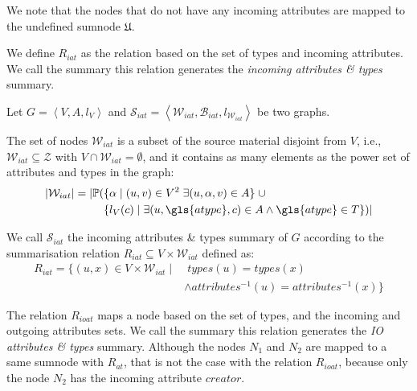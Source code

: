 \begin{remark}
We note that the nodes that do not have any incoming attributes are mapped to the undefined sumnode $\mathfrak{U}$.
\end{remark}

\vspace{.5cm}


We define $R_{iat}$ as the relation based on the set of types and incoming attributes. We call the summary this relation generates the \emph{incoming attributes \& types} summary.

\begin{definition}
	Let $G=\left\langle V, A, l_V \right\rangle$ and $\mathcal{S}_{iat} = \left\langle \mathcal{W}_{iat}, \mathcal{B}_{iat}, l_{\mathcal{W}_{iat}} \right\rangle$ be two graphs.

	The set of nodes $\mathcal{W}_{iat}$ is a subset of the source material disjoint from $V$, i.e., $\mathcal{W}_{iat} \subseteq \mathcal{Z}$ with $V \cap \mathcal{W}_{iat} = \emptyset$, and it contains as many elements as the power set of attributes and types in the graph:
	$$
	\begin{aligned}
	\lvert \mathcal{W}_{iat} \rvert = \lvert \mathbb{P} ( & \{ \alpha \mid (u, v) \in V^2\; \exists (u, \alpha, v) \in A \} \;\cup \\
	& \{ l_V(c) \mid \exists (u, \gls{atype}, c) \in A \wedge \gls{atype} \in T \} ) \rvert
	\end{aligned}
	$$

	We call $\mathcal{S}_{iat}$ the incoming attributes \& types summary of $G$ according to the summarisation relation $R_{iat} \subseteq V \times \mathcal{W}_{iat}$ defined as:
	$$
	\begin{aligned}
	R_{iat} = \{ (u, x) \in V \times \mathcal{W}_{iat} \mid &\; types(u) = types(x) \\
	& \wedge attributes^{-1}(u) = attributes^{-1}(x) \}
	\end{aligned}
	$$
	\label{def:iat}
\end{definition}
\vspace{.5cm}


The relation $R_{ioat}$ maps a node based on the set of types, and the incoming and outgoing attributes sets. We call the summary this relation generates the \emph{IO attributes \& types} summary.
Although the nodes $N_1$ and $N_2$ are mapped to a same sumnode with $R_{at}$, that is not the case with the relation $R_{ioat}$, because only the node $N_2$ has the incoming attribute $creator$.

